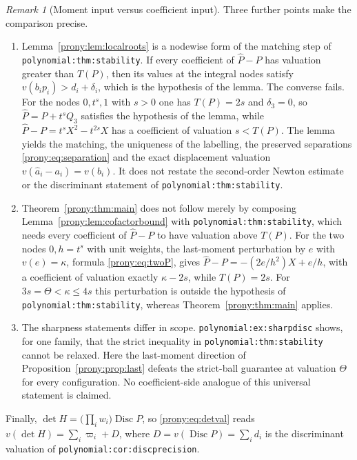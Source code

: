 \documentclass[11pt,letterpaper]{article}
\theoremstyle{definition}
\theoremstyle{remark}
\newtheorem{remark}[theorem]{Remark}
\newcommand{\Ph}{\widehat P}
\newcommand{\ah}{\widehat a}
\newcommand{\lbl}[1]{\nolinkurl{#1}}%
\DeclareMathOperator{\Disc}{Disc}
\begin{document}
\begin{remark}[Moment input versus coefficient input]
Three further points make the comparison precise.
\begin{enumerate}[label=(\alph*)]
\item Lemma~\ref{prony:lem:localroots} is a nodewise form of the matching step
of \lbl{polynomial:thm:stability}. If every coefficient of $\Ph-P$ has
valuation greater than $T(P)$, then its values at the integral nodes satisfy
$v(b_ip_i)>d_i+\delta_i$, which is the hypothesis of the lemma. The converse
fails. For the nodes $0,t^s,1$ with $s>0$ one has $T(P)=2s$ and
$\delta_3=0$, so $\Ph=P+t^sQ_3$ satisfies the hypothesis of the lemma, while
$\Ph-P=t^sX^2-t^{2s}X$ has a coefficient of valuation $s<T(P)$. The lemma
yields the matching, the uniqueness of the labelling, the preserved
separations \eqref{prony:eq:separation} and the exact displacement valuation
$v(\ah_i-a_i)=v(b_i)$. It does not restate the second-order Newton estimate
or the discriminant statement of \lbl{polynomial:thm:stability}.
\item Theorem~\ref{prony:thm:main} does not follow merely by composing
Lemma~\ref{prony:lem:cofactorbound} with \lbl{polynomial:thm:stability},
which needs every coefficient of $\Ph-P$ to have valuation above $T(P)$. For
the two nodes $0,h=t^s$ with unit weights, the last-moment perturbation by
$e$ with $v(e)=\kappa$, formula \eqref{prony:eq:twoP}, gives $\Ph-P=-(2e/h^2)X+e/h$, with a coefficient of
valuation exactly $\kappa-2s$, while $T(P)=2s$. For $3s=\Theta<\kappa\le4s$
this perturbation is outside the hypothesis of
\lbl{polynomial:thm:stability}, whereas Theorem~\ref{prony:thm:main}
applies.
\item The sharpness statements differ in scope.
\lbl{polynomial:ex:sharpdisc} shows, for one family, that the strict
inequality in \lbl{polynomial:thm:stability} cannot be relaxed. Here the
last-moment direction of Proposition~\ref{prony:prop:last} defeats the
strict-ball guarantee at valuation $\Theta$ for every configuration. No
coefficient-side analogue of this universal statement is claimed.
\end{enumerate}
Finally, $\det H=\bigl(\prod_iw_i\bigr)\Disc P$, so \eqref{prony:eq:detval}
reads $v(\det H)=\sum_i\varpi_i+D$, where $D=v(\Disc P)=\sum_id_i$ is the
discriminant valuation of \lbl{polynomial:cor:discprecision}.
\end{remark}
\end{document}
